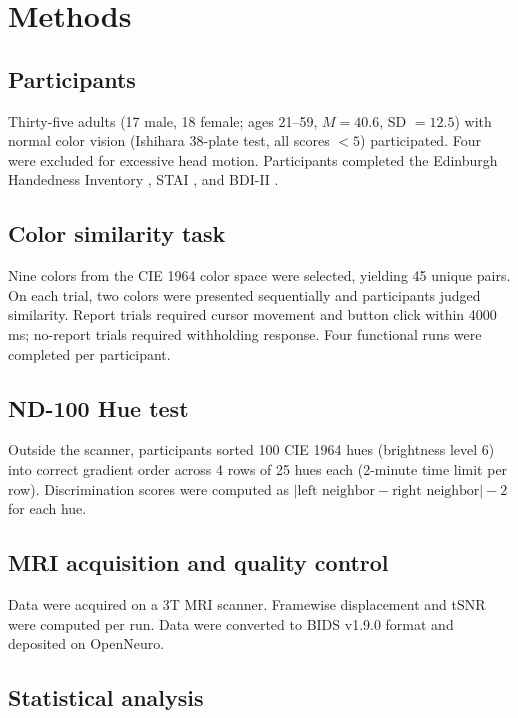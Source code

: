 \documentclass[11pt]{article}
\begin{document}
\section{Methods}

\subsection{Participants}

Thirty-five adults (17 male, 18 female; ages 21--59, $M = 40.6$, SD $= 12.5$) with normal color vision (Ishihara 38-plate test, all scores $< 5$) participated. Four were excluded for excessive head motion. Participants completed the Edinburgh Handedness Inventory \citep{oldfield1971}, STAI \citep{spielberger1983}, and BDI-II \citep{beck1996}.

\subsection{Color similarity task}

Nine colors from the CIE 1964 color space \citep{cie1964} were selected, yielding 45 unique pairs. On each trial, two colors were presented sequentially and participants judged similarity. Report trials required cursor movement and button click within 4000 ms; no-report trials required withholding response. Four functional runs were completed per participant.

\subsection{ND-100 Hue test}

Outside the scanner, participants sorted 100 CIE 1964 hues (brightness level 6) into correct gradient order across 4 rows of 25 hues each (2-minute time limit per row). Discrimination scores were computed as $|\text{left neighbor} - \text{right neighbor}| - 2$ for each hue.

\subsection{MRI acquisition and quality control}

Data were acquired on a 3T MRI scanner. Framewise displacement \citep{power2012} and tSNR were computed per run. Data were converted to BIDS v1.9.0 format and deposited on OpenNeuro.

\subsection{Statistical analysis}
\end{document}

